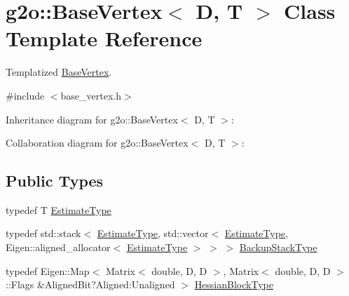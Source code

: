 \hypertarget{classg2o_1_1BaseVertex}{}\section{g2o\+:\+:Base\+Vertex$<$ D, T $>$ Class Template Reference}
\label{classg2o_1_1BaseVertex}


Templatized \hyperlink{classg2o_1_1BaseVertex}{Base\+Vertex}.  




{\ttfamily \#include $<$base\+\_\+vertex.\+h$>$}



Inheritance diagram for g2o\+:\+:Base\+Vertex$<$ D, T $>$\+:


Collaboration diagram for g2o\+:\+:Base\+Vertex$<$ D, T $>$\+:
\subsection*{Public Types}
\begin{DoxyCompactItemize}
\item 
typedef T \hyperlink{classg2o_1_1BaseVertex_aaffb179a0d591da4769ec7c3fc7f7daa}{Estimate\+Type}
\item 
typedef std\+::stack$<$ \hyperlink{classg2o_1_1BaseVertex_aaffb179a0d591da4769ec7c3fc7f7daa}{Estimate\+Type}, std\+::vector$<$ \hyperlink{classg2o_1_1BaseVertex_aaffb179a0d591da4769ec7c3fc7f7daa}{Estimate\+Type}, Eigen\+::aligned\+\_\+allocator$<$ \hyperlink{classg2o_1_1BaseVertex_aaffb179a0d591da4769ec7c3fc7f7daa}{Estimate\+Type} $>$ $>$ $>$ \hyperlink{classg2o_1_1BaseVertex_ae6632291d46b458196bdb021a6c8cba1}{Backup\+Stack\+Type}
\item 
typedef Eigen\+::\+Map$<$ Matrix$<$ double, D, D $>$, Matrix$<$ double, D, D $>$\+::Flags \&Aligned\+Bit?Aligned\+:\+Unaligned $>$ \hyperlink{classg2o_1_1BaseVertex_a887928bc60710e0ec9acb269ee7411db}{Hessian\+Block\+Type}
\end{DoxyCompactItemize}
